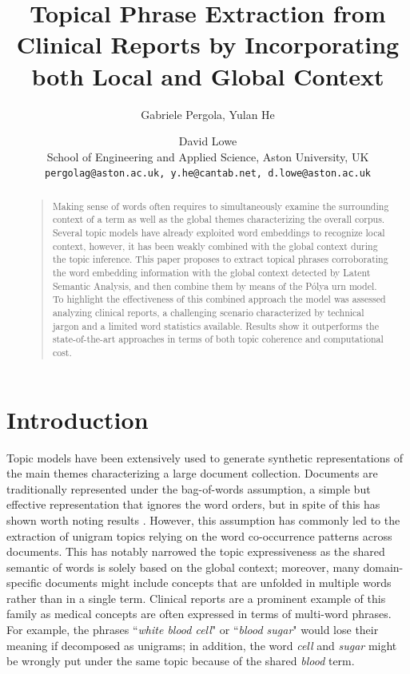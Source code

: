 \documentclass[letterpaper]{article}
\begin{document}
%
\title{Topical Phrase Extraction from Clinical Reports by Incorporating both Local and Global Context}
\author{Gabriele Pergola, Yulan He \and David Lowe\\
 School of Engineering and Applied Science, Aston University, UK\\
  {\tt pergolag@aston.ac.uk, y.he@cantab.net, d.lowe@aston.ac.uk}
}

\maketitle
\begin{abstract}
\begin{quote}

Making sense of words often requires to simultaneously examine the surrounding context of a term as well as the global themes characterizing the overall corpus. Several topic models have already exploited word embeddings to recognize local context, however, it has been weakly combined with the global context during the topic inference. 
This paper proposes to extract topical phrases corroborating the word embedding information with the global context detected by Latent Semantic Analysis, and then combine them by means of the P\'{o}lya urn model. To highlight the effectiveness of this combined approach the model was assessed analyzing clinical reports, a challenging scenario characterized by technical jargon and a limited word statistics available. Results show it outperforms the state-of-the-art approaches in terms of both topic coherence and computational cost.

\end{quote}
\end{abstract}

\section{Introduction}
Topic models have been extensively used to generate synthetic representations of the main themes characterizing a large document collection. Documents are traditionally represented under the bag-of-words assumption, a simple but effective representation that ignores the word orders, but in spite of this has shown worth noting results \cite{Blei03}.
However, this assumption has commonly led to the extraction of unigram topics relying on the word co-occurrence patterns across documents. This has notably narrowed the topic expressiveness as the shared semantic of words is solely based on the global context; moreover, many domain-specific documents might include concepts that are unfolded in multiple words rather than in a single term.
Clinical reports are a prominent example of this family as medical concepts are often expressed in terms of multi-word phrases. For example, the phrases ``\textit{white blood cell}" or ``\textit{blood sugar}" would lose their meaning if decomposed as unigrams; in addition, the word \textit{cell} and \textit{sugar} might be wrongly put under the same topic because of the shared \textit{blood} term.
\end{document}
